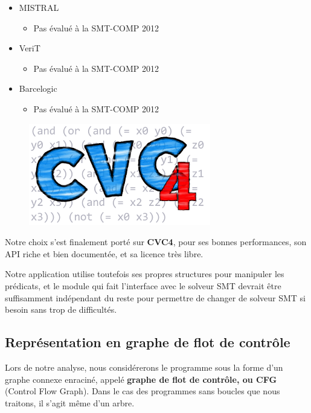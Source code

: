 \documentclass[french]{article}
\begin{document}
\begin{itemize}
\begin{itemize}
    \end{itemize}
    \item MISTRAL~\cite{smt_mistral}
    \begin{itemize}
      \item Pas évalué à la SMT-COMP 2012
    \end{itemize}
    \item VeriT~\cite{smt_verit}
    \begin{itemize}
      \item Pas évalué à la SMT-COMP 2012
    \end{itemize}
    \item Barcelogic~\cite{smt_barcelogic}
    \begin{itemize}
      \item Pas évalué à la SMT-COMP 2012
    \end{itemize}
  \end{itemize}
  
  \begin{figure}
    \centering
    \includegraphics{./pictures/cvc4.png}
    \label{cvc4}
  \end{figure}
  
  Notre choix s'est finalement porté sur \textbf{CVC4}, pour ses bonnes performances, son API riche et bien documentée, et sa licence très libre.
  
  Notre application utilise toutefois ses propres structures pour manipuler les prédicats, et le module qui fait l'interface avec le solveur SMT devrait être suffisamment indépendant du reste pour permettre de changer de solveur SMT si besoin sans trop de difficultés.
  
  \subsection{Représentation en graphe de flot de contrôle}
  Lors de notre analyse, nous considérerons le programme sous la forme d'un graphe connexe enraciné, appelé \textbf{graphe de flot de contrôle, ou CFG} (Control Flow Graph). Dans le cas des programmes sans boucles que nous traitons, il s'agit même d'un arbre.
  
\end{document}
